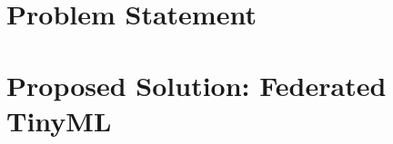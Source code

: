 
\section{Problem Statement}
\label{sec:problem-statement}






\section{Proposed Solution: Federated TinyML}
\label{sec:proposed-solution}



